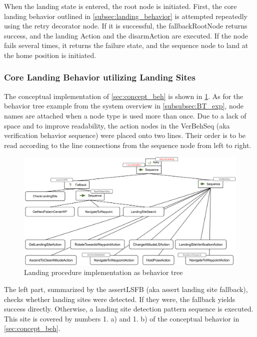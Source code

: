 When the landing state is entered, the root node is initiated. First, the core landing behavior outlined in \cref{subsec:landing_behavior} is attempted repeatedly using the retry decorator node. If it is successful, the fallbackRootNode returns success, and the landing Action and the disarmAction are executed. If the node fails several times, it returns the failure state, and the sequence node to land at the home position is initiated.

\subsubsection{Core Landing Behavior utilizing Landing Sites}

The conceptual implementation of \cref{sec:concept_beh} is shown in \cref{fig:landing_BT}. As for the behavior tree example from the system overview in \cref{subsubsec:BT_exp}, node names are attached when a node type is used more than once. Due to a lack of space and to improve readability, the action nodes in the VerBehSeq (aka verification behavior sequence) were placed onto two lines. Their order is to be read according to the line connections from the sequence node from left to right.

\begin{figure}[h]
\centering
\includegraphics[scale=0.18]{images/autonomous_landing/landing_behavior_BT.png}
\caption{Landing procedure implementation as behavior tree}
\label{fig:landing_BT}
\end{figure}

The left part, summarized by the assertLSFB (aka assert landing site fallback), checks whether landing sites were detected. If they were, the fallback yields success directly. Otherwise, a landing site detection pattern sequence is executed. This site is covered by numbers 1. a) and 1. b) of the conceptual behavior in \cref{sec:concept_beh}.

